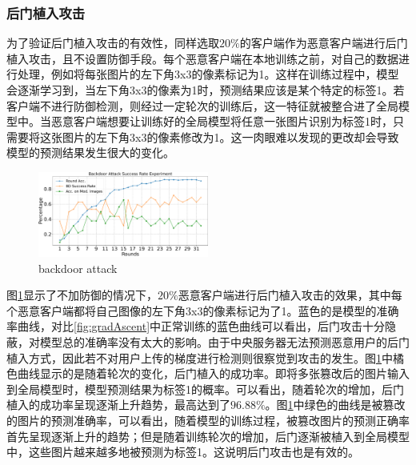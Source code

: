 \documentclass[conference]{IEEEtran}
\def\figBackdoorAttack{0.5\textwidth}
\begin{document}
\subsubsection{\textbf{后门植入攻击}}
\label{exp:attack:backdoor}

为了验证后门植入攻击的有效性，同样选取$20\%$的客户端作为恶意客户端进行后门植入攻击，且不设置防御手段。每个恶意客户端在本地训练之前，对自己的数据进行处理，例如将每张图片的左下角3x3的像素标记为1。这样在训练过程中，模型会逐渐学习到，当左下角3x3的像素为1时，预测结果应该是某个特定的标签1。若客户端不进行防御检测，则经过一定轮次的训练后，这一特征就被整合进了全局模型中。当恶意客户端想要让训练好的全局模型将任意一张图片识别为标签1时，只需要将这张图片的左下角3x3的像素修改为1。这一肉眼难以发现的更改却会导致模型的预测结果发生很大的变化。

\begin{figure}[htbp]
    \centerline{\includegraphics[width=\figBackdoorAttack]{pics/003-backdoorAttack.pdf}}
    \caption{backdoor attack}
    \label{fig:backdoorAttack}
\end{figure}

图\hyperref[fig:backdoorAttack]{\ref{fig:backdoorAttack}}显示了不加防御的情况下，$20\%$恶意客户端进行后门植入攻击的效果，其中每个恶意客户端都将自己图像的左下角3x3的像素标记为了1。蓝色的是模型的准确率曲线，对比\hyperref[fig:gradAscent]{\ref{fig:gradAscent}}中正常训练的蓝色曲线可以看出，后门攻击十分隐蔽，对模型总的准确率没有太大的影响。由于中央服务器无法预测恶意用户的后门植入方式，因此若不对用户上传的梯度进行检测则很察觉到攻击的发生。图\hyperref[fig:backdoorAttack]{\ref{fig:backdoorAttack}}中橘色曲线显示的是随着轮次的变化，后门植入的成功率。即将多张篡改后的图片输入到全局模型时，模型预测结果为标签1的概率。可以看出，随着轮次的增加，后门植入的成功率呈现逐渐上升趋势，最高达到了$96.88\%$。图\hyperref[fig:backdoorAttack]{\ref{fig:backdoorAttack}}中绿色的曲线是被篡改的图片的预测准确率，可以看出，随着模型的训练过程，被篡改图片的预测正确率首先呈现逐渐上升的趋势；但是随着训练轮次的增加，后门逐渐被植入到全局模型中，这些图片越来越多地被预测为标签1。这说明后门攻击也是有效的。
\end{document}

